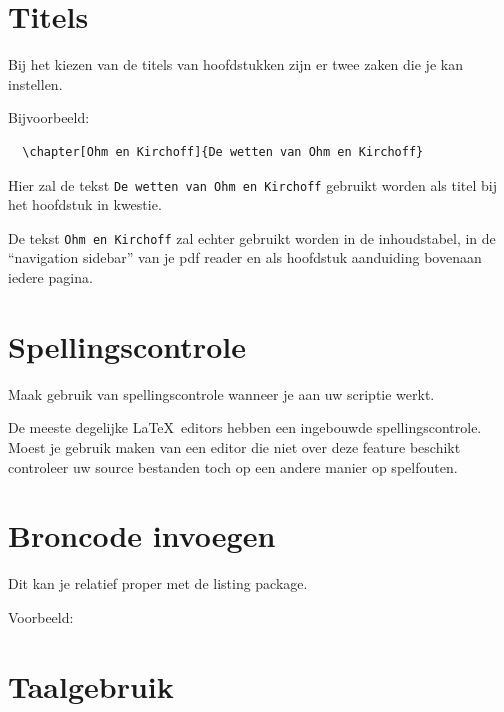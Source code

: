 \section{Titels}

Bij het kiezen van de titels van hoofdstukken zijn er twee zaken die je kan instellen.

Bijvoorbeeld:

\begin{verbatim}
  \chapter[Ohm en Kirchoff]{De wetten van Ohm en Kirchoff}
\end{verbatim}

Hier zal de tekst \texttt{De wetten van Ohm en Kirchoff} gebruikt worden als titel bij het hoofdstuk in kwestie.

De tekst \texttt{Ohm en Kirchoff} zal echter gebruikt worden in de inhoudstabel, in de ``navigation sidebar'' van je pdf reader en als hoofdstuk aanduiding bovenaan iedere pagina.

\section{Spellingscontrole}

Maak gebruik van spellingscontrole wanneer je aan uw scriptie werkt.

De meeste degelijke \LaTeX\ editors hebben een ingebouwde spellingscontrole.
Moest je gebruik maken van een editor die niet over deze feature beschikt controleer uw source bestanden toch op een andere manier op spelfouten.

\section{Broncode invoegen}

Dit kan je relatief proper met de listing package.

Voorbeeld:

\lstset{numbers=left, stepnumber=1, basicstyle=\footnotesize, language=C++, caption=AcceleroDice.ino: Minimal Implementation, label=AcceleroDice, frame=none, xleftmargin=.3in}


\section[taal]{Taalgebruik}

